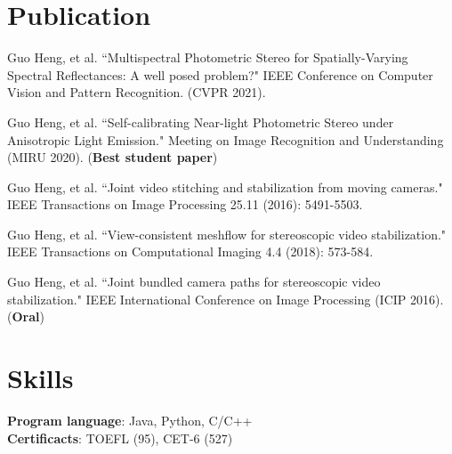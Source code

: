 \documentclass[letterpaper,11pt]{article}
\begin{document}
\section{Publication}
\begin{enumerate}[label={[\arabic*]}]
	\item Guo Heng, et al. ``Multispectral Photometric Stereo for Spatially-Varying Spectral Reflectances: A well posed problem?" IEEE Conference on Computer Vision and Pattern Recognition. (CVPR 2021). 
	\item Guo Heng, et al. ``Self-calibrating Near-light Photometric Stereo under Anisotropic Light Emission." Meeting on Image Recognition and Understanding (MIRU 2020).  (\textbf{Best student paper}) 
	\item Guo Heng, et al. ``Joint video stitching and stabilization from moving cameras." IEEE Transactions on Image Processing 25.11 (2016): 5491-5503.
	\item Guo Heng, et al. ``View-consistent meshflow for stereoscopic video stabilization." IEEE Transactions on Computational Imaging 4.4 (2018): 573-584.
	\item Guo Heng, et al. ``Joint bundled camera paths for stereoscopic video stabilization." IEEE International Conference on Image Processing (ICIP 2016). (\textbf{Oral})
\end{enumerate}

%
\section{Skills}
 \begin{itemize}[leftmargin=0.15in, label={}]
    \small{\item{
     \textbf{Program language}{: Java, Python, C/C++} \\
     \textbf{Certificacts}{: TOEFL (95), CET-6 (527)} \\
    }}
 \end{itemize}


\end{document}
